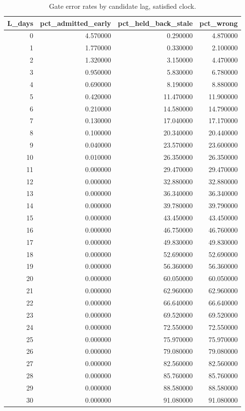 \begin{table}
\caption{Gate error rates by candidate lag, satisfied clock.}
\label{tab:nb16_lag_error_satisfied}
\begin{tabular}{rrrr}
\toprule
L_days & pct_admitted_early & pct_held_back_stale & pct_wrong \\
\midrule
0 & 4.570000 & 0.290000 & 4.870000 \\
1 & 1.770000 & 0.330000 & 2.100000 \\
2 & 1.320000 & 3.150000 & 4.470000 \\
3 & 0.950000 & 5.830000 & 6.780000 \\
4 & 0.690000 & 8.190000 & 8.880000 \\
5 & 0.420000 & 11.470000 & 11.900000 \\
6 & 0.210000 & 14.580000 & 14.790000 \\
7 & 0.130000 & 17.040000 & 17.170000 \\
8 & 0.100000 & 20.340000 & 20.440000 \\
9 & 0.040000 & 23.570000 & 23.600000 \\
10 & 0.010000 & 26.350000 & 26.350000 \\
11 & 0.000000 & 29.470000 & 29.470000 \\
12 & 0.000000 & 32.880000 & 32.880000 \\
13 & 0.000000 & 36.340000 & 36.340000 \\
14 & 0.000000 & 39.780000 & 39.790000 \\
15 & 0.000000 & 43.450000 & 43.450000 \\
16 & 0.000000 & 46.750000 & 46.760000 \\
17 & 0.000000 & 49.830000 & 49.830000 \\
18 & 0.000000 & 52.690000 & 52.690000 \\
19 & 0.000000 & 56.360000 & 56.360000 \\
20 & 0.000000 & 60.050000 & 60.050000 \\
21 & 0.000000 & 62.960000 & 62.960000 \\
22 & 0.000000 & 66.640000 & 66.640000 \\
23 & 0.000000 & 69.520000 & 69.520000 \\
24 & 0.000000 & 72.550000 & 72.550000 \\
25 & 0.000000 & 75.970000 & 75.970000 \\
26 & 0.000000 & 79.080000 & 79.080000 \\
27 & 0.000000 & 82.560000 & 82.560000 \\
28 & 0.000000 & 85.760000 & 85.760000 \\
29 & 0.000000 & 88.580000 & 88.580000 \\
30 & 0.000000 & 91.080000 & 91.080000 \\
\bottomrule
\end{tabular}
\end{table}
